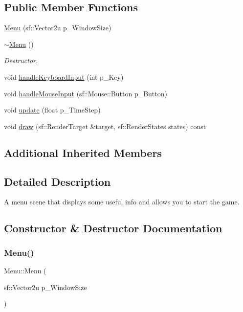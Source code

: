 \subsection*{Public Member Functions}
\begin{DoxyCompactItemize}
\item 
\hyperlink{class_menu_a9d1e0ed519f27305e1e5a7237f1586bb}{Menu} (sf\+::\+Vector2u p\+\_\+\+Window\+Size)
\item 
\mbox{\label{class_menu_a831387f51358cfb88cd018e1777bc980}} 
\hyperlink{class_menu_a831387f51358cfb88cd018e1777bc980}{$\sim$\+Menu} ()
\begin{DoxyCompactList}\small\item\em Destructor. \end{DoxyCompactList}\item 
void \hyperlink{class_menu_a2ebc63a5e64b90dcfae4284e7f7f4be6}{handle\+Keyboard\+Input} (int p\+\_\+\+Key)
\item 
void \hyperlink{class_menu_a4f99fe96e47268bd4561df0c8faa23c8}{handle\+Mouse\+Input} (sf\+::\+Mouse\+::\+Button p\+\_\+\+Button)
\item 
void \hyperlink{class_menu_a8043b25a060513367b0e286d3ae397d2}{update} (float p\+\_\+\+Time\+Step)
\item 
void \hyperlink{class_menu_aa0e69963ee402f3559680e5a691b03fd}{draw} (sf\+::\+Render\+Target \&target, sf\+::\+Render\+States states) const
\end{DoxyCompactItemize}
\subsection*{Additional Inherited Members}


\subsection{Detailed Description}
A menu scene that displays some useful info and allows you to start the game. 

\subsection{Constructor \& Destructor Documentation}
\mbox{\label{class_menu_a9d1e0ed519f27305e1e5a7237f1586bb}} 
\subsubsection{\texorpdfstring{Menu()}{Menu()}}
{\footnotesize\ttfamily Menu\+::\+Menu (\begin{DoxyParamCaption}\item[{sf\+::\+Vector2u}]{p\+\_\+\+Window\+Size }\end{DoxyParamCaption})}

